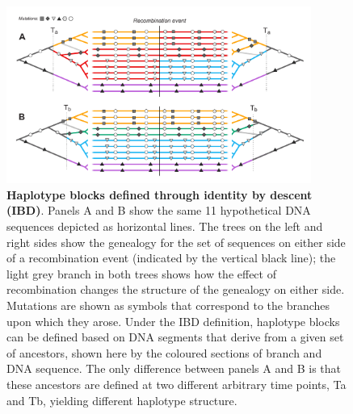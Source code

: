 \documentclass[twocolumn]{bmcart}%
\begin{document}
\begin{figure}
    \includegraphics[width=0.89\textwidth]{Fig_2.pdf}
    \caption{\footnotesize{\textbf{Haplotype blocks defined through identity by descent (IBD)}. Panels A and B show the same 11 hypothetical DNA sequences depicted as horizontal lines. The trees on the left and right sides show the genealogy for the set of sequences on either side of a recombination event (indicated by the vertical black line); the light grey branch in both trees shows how the effect of recombination changes the structure of the genealogy on either side. Mutations are shown as symbols that correspond to the branches upon which they arose. Under the IBD definition, haplotype blocks can be defined based on DNA segments that derive from a given set of ancestors, shown here by the coloured sections of branch and DNA sequence. The only difference between panels A and B is that these ancestors are defined at two different arbitrary time points, Ta and Tb, yielding different haplotype structure.}}
    \label{fig:2}
\end{figure}
\end{document}
